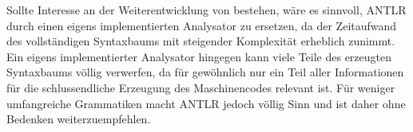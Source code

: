 Sollte Interesse an der Weiterentwicklung von \toya bestehen, wäre es sinnvoll, ANTLR durch einen eigens implementierten Analysator zu ersetzen, da der Zeitaufwand des vollständigen Syntaxbaums mit steigender Komplexität erheblich zunimmt. Ein eigens implementierter Analysator hingegen kann viele Teile des erzeugten Syntaxbaums völlig verwerfen, da für gewöhnlich nur ein Teil aller Informationen für die schlussendliche Erzeugung des Maschinencodes relevant ist. Für weniger umfangreiche Grammatiken macht ANTLR jedoch völlig Sinn und ist daher ohne Bedenken weiterzuempfehlen.